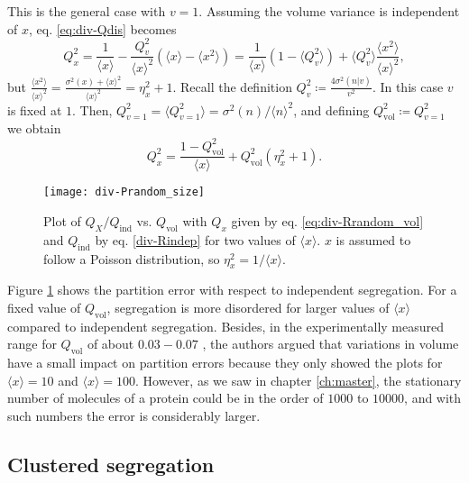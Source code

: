 This is the general case with $v=1$. Assuming the volume variance is independent of $x$, eq. \eqref{eq:div-Qdis} becomes
\begin{equation*}
  Q_x^2 = \frac{1}{\langle x\rangle} - \frac{Q_v^2}{\langle x\rangle^2}\left(\langle x\rangle  - \langle x^2\rangle\right) = \frac{1}{\langle x\rangle}\left(1-\langle Q_v^2\rangle\right) + \langle Q_v^2\rangle\frac{\langle x^2\rangle}{\langle x\rangle^2},
\end{equation*}
but $\frac{\langle x^2\rangle}{\langle x\rangle^2} = \frac{\sigma^2(x) + \langle x\rangle^2}{\langle x\rangle^2} = \eta_x^2 + 1$. Recall the definition  $Q_v^2 \coloneqq \frac{4\sigma^2(n|v)}{v^2}$. In this case $v$ is fixed at $1$. Then, $Q_{v=1}^2 = \langle Q_{v=1}^2\rangle = \sigma^2(n)/\langle n\rangle^2$, and defining $Q^2_\text{vol}\coloneqq Q_{v=1}^2$ we obtain
\begin{equation}
  \label{eq:div-Rrandom_vol}
  Q_x^2 = \frac{1-Q_\text{vol}^2}{\langle x\rangle} + Q_\text{vol}^2(\eta^2_x+1).
\end{equation}
\begin{figure}[H]
  \centering
  \texttt{[image: div-Prandom\_size]}
  \caption[Partition noise when the sizes of the daughter cells are random]{\label{fig:div-Prandom_size}Plot of $Q_X/Q_\text{ind}$ vs. $Q_\text{vol}$ with $Q_x$ given by eq. \eqref{eq:div-Rrandom_vol} and $Q_\text{ind}$ by eq. \eqref{div-Rindep} for two values of $\langle x\rangle$. $x$ is assumed to follow a Poisson distribution, so $\eta_x^2=1/\langle x\rangle$.}
\end{figure}

Figure \ref{fig:div-Prandom_size} shows the partition error with respect to independent segregation. For a fixed value of $Q_\text{vol}$, segregation is more disordered for larger values of $\langle x\rangle$ compared to independent segregation. Besides, in the experimentally measured range for $Q_\text{vol}$ of about $0.03 - 0.07$ \cite{huh11b}, the authors argued that variations in volume have a small impact on partition errors because they only showed the plots for $\langle x\rangle = 10$ and $\langle x\rangle = 100$. However, as we saw in chapter \ref{ch:master}, the stationary number of molecules of a protein could be in the order of $1000$ to $10000$, and with such numbers the error is considerably larger.

\subsection{Clustered segregation}

